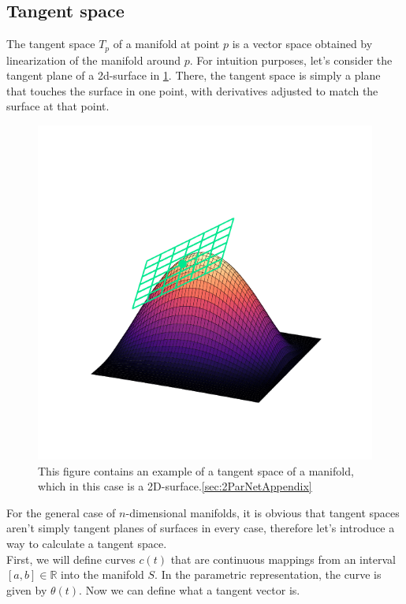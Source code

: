 \subsection{Tangent space}
The tangent space $T_p$ of a manifold at point $p$ is a vector space obtained by linearization of the manifold around $p$. For intuition purposes, let's consider the tangent plane of a 2d-surface in \cref{fig:TangentSpacePlot}. There, the tangent space is simply a plane that touches the surface in one point, with derivatives adjusted to match the surface at that point.
\begin{figure}\label{fig:TangentSpacePlot}
	\centering
	\includegraphics[width = 12cm, clip, trim= 0cm 1.5cm 0cm 2cm]{text/FisherInformation/plots/TangentSpacePlot.pdf}
	\caption{This figure contains an example of a tangent space of a manifold, which in this case is a 2D-surface.\cite{A_logical_calculus_of_the_ideas_immanent_in_nervous_activity}\cref{sec:2ParNetAppendix}}
\end{figure}
For the general case of $n$-dimensional manifolds, it is obvious that tangent spaces aren't simply tangent planes of surfaces in every case, therefore let's introduce a way to calculate a tangent space.\\
First, we will define curves $c(t)$ that are continuous mappings from an interval $[a,b] \in \mathbb{R}$ into the manifold $S$. In the parametric representation, the curve is given by $\theta(t)$. Now we can define what a tangent vector is.\\
